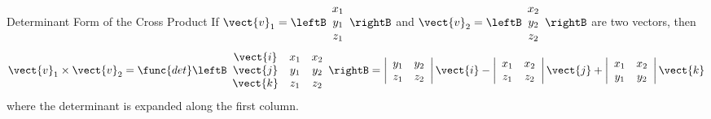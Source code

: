 \begin{theorem*}[label=012151]{Determinant Form of the Cross Product}
If 
$\vect{v}_{1}= \leftB
\begin{array}{c}
x_{1}\\
y_{1}\\
z_{1}
\end{array}
\rightB$
and 
$\vect{v}_{2}= \leftB
\begin{array}{c}
x_{2}\\
y_{2}\\
z_{2}
\end{array}
\rightB$
 are two vectors, then
\begin{equation*}
\vect{v}_{1} \times \vect{v}_{2} = \func{det}\leftB
\begin{array}{ccc}
\vect{i} & x_{1} & x_{2}\\
\vect{j} & y_{1} & y_{2}\\
\vect{k} & z_{1} & z_{2}
\end{array}
\rightB
=
\left|
\begin{array}{cc}
y_{1} & y_{2}\\
z_{1} & z_{2}
\end{array}
\right|\vect{i}
-
\left|
\begin{array}{cc}
x_{1} & x_{2}\\
z_{1} & z_{2}
\end{array}
\right|\vect{j}
+
\left|
\begin{array}{cc}
x_{1} & x_{2}\\
y_{1} & y_{2}
\end{array}
\right|\vect{k}
\end{equation*}
where the determinant is expanded along the first column.
\end{theorem*} 

